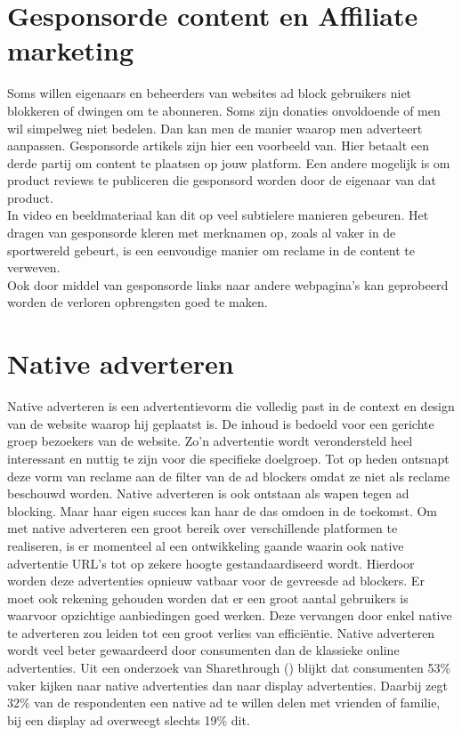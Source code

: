 \documentclass[pdftex,a4paper,12pt,twoside]{report}
\begin{document}
\section{Gesponsorde content en Affiliate marketing}
\label{sec Gesponsorde content en affiliate marketing}
Soms willen eigenaars en beheerders van websites ad block gebruikers niet blokkeren of dwingen om te abonneren. Soms zijn donaties onvoldoende of men wil simpelweg niet bedelen. Dan kan men de manier waarop men adverteert aanpassen. Gesponsorde artikels zijn hier een voorbeeld van. Hier betaalt een derde partij om content te plaatsen op jouw platform. Een andere mogelijk is om product reviews te publiceren die gesponsord worden door de eigenaar van dat product. 
\\
In video en beeldmateriaal kan dit op veel subtielere manieren gebeuren. Het dragen van gesponsorde kleren met merknamen op, zoals al vaker in de sportwereld gebeurt, is een eenvoudige manier om reclame in de content te verweven.
\\
Ook door middel van gesponsorde links naar andere webpagina's kan geprobeerd worden de verloren opbrengsten goed te maken.
\section{Native adverteren}
\label{sec Native adverteren}
Native adverteren is een advertentievorm die volledig past in de context en design van de website waarop hij geplaatst is. De inhoud is bedoeld voor een gerichte groep bezoekers van de website. Zo’n advertentie wordt verondersteld heel interessant en nuttig te zijn voor die specifieke doelgroep. Tot op heden ontsnapt deze vorm van reclame aan de filter van de ad blockers omdat ze niet als reclame beschouwd worden. Native adverteren is ook ontstaan als wapen tegen ad blocking. Maar haar eigen succes kan haar de das omdoen in de toekomst. Om met native adverteren een groot bereik over verschillende platformen te realiseren, is er momenteel al een ontwikkeling gaande waarin ook native advertentie URL's tot op zekere hoogte gestandaardiseerd wordt. Hierdoor worden deze advertenties opnieuw vatbaar voor de gevreesde ad blockers. Er moet ook rekening gehouden worden dat er een groot aantal gebruikers is waarvoor opzichtige aanbiedingen goed werken. Deze vervangen door enkel native te adverteren zou leiden tot een groot verlies van efficiëntie.
Native adverteren wordt veel beter gewaardeerd door consumenten dan de klassieke online advertenties. Uit een onderzoek van Sharethrough (\cite{ShareThrough2013}) blijkt dat consumenten 53\% vaker kijken naar native advertenties dan naar display advertenties. Daarbij zegt 32\% van de respondenten een native ad te willen delen met vrienden of familie, bij een display ad overweegt slechts 19\% dit.
\end{document}
